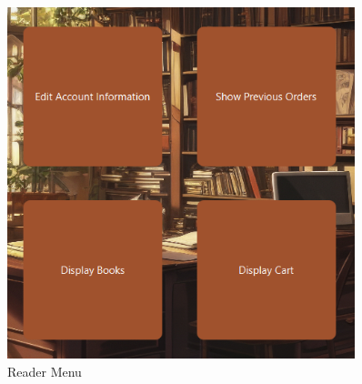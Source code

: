 \documentclass[a4paper,14pt]{extarticle}
\begin{document}
\newpage
\begin{figure}[H]
    \centering
    \includegraphics[width=0.9\textwidth]{Media/Reader Menu.png}
    \caption{Reader Menu}
\end{figure}
\newpage
\end{document}
